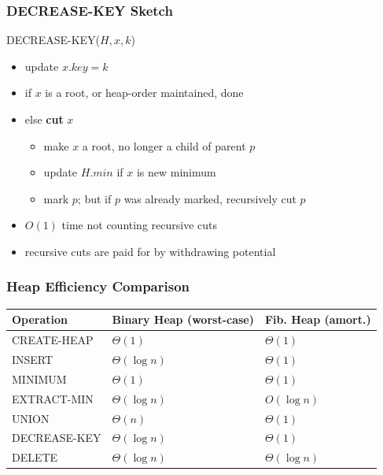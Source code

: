 \documentclass{beamer}
\begin{document}
\begin{frame} \frametitle{DECREASE-KEY Sketch}
DECREASE-KEY($H, x, k$)
\begin{itemize}
  \item update $x.key = k$
  \item if $x$ is a root, or heap-order maintained, done
  \item else \textbf{cut} $x$
    \begin{itemize}
      \item make $x$ a root, no longer a child of parent $p$
      \item update $H.min$ if $x$ is new minimum
      \item mark $p$; but if $p$ was already marked, recursively cut $p$
    \end{itemize}
  \item $O(1)$ time not counting recursive cuts
  \item recursive cuts are paid for by withdrawing potential
\end{itemize}
\end{frame}

\begin{frame} \frametitle{Heap Efficiency Comparison}
  \begin{center}
    \begin{tabular}{lll}
      \textbf{Operation} & Binary Heap (worst-case) & Fib. Heap (amort.) \\ \hline
      CREATE-HEAP & $\Theta(1)$ & $\Theta(1)$ \\
      INSERT & $\Theta(\log n)$ & $\Theta(1)$  \\
      MINIMUM & $\Theta(1)$ & $\Theta(1)$ \\
      EXTRACT-MIN &  $\Theta(\log n)$ & $O(\log n)$ \\
      UNION & $\Theta(n)$ & $\Theta(1)$ \\
      DECREASE-KEY & $\Theta(\log n)$ & $\Theta(1)$ \\
      DELETE & $\Theta(\log n)$ & $\Theta(\log n)$
    \end{tabular}
  \end{center}
\end{frame}
\end{document}
